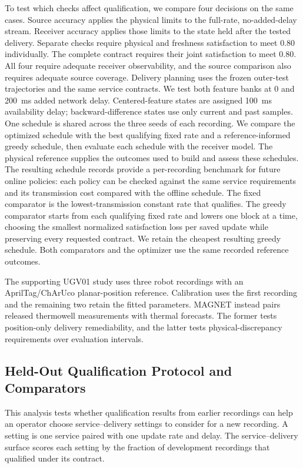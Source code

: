 \documentclass[journal]{IEEEtran}
\newcommand{\new}[1]{#1}
\newcommand{\rev}[1]{#1}
\begin{document}
To test which checks affect qualification, we compare four decisions on
the same cases. Source accuracy applies the physical limits to the
full-rate, no-added-delay stream. Receiver accuracy applies those limits
to the state held after the tested delivery. Separate checks require
physical and freshness satisfaction to meet 0.80 individually. The
complete contract requires their joint satisfaction to meet 0.80.
All four require adequate receiver observability, and the source
comparison also requires adequate source coverage.
\new{Delivery planning uses the frozen outer-test trajectories and the
same service contracts. We test both feature banks at 0 and 200~ms added
network delay. Centered-feature states are assigned 100~ms availability
delay; backward-difference states use only current and past samples. One
schedule is shared across the three seeds of each recording. We compare
the optimized schedule with the best qualifying fixed rate and a
reference-informed greedy schedule, then evaluate each schedule with the
receiver model. The physical reference supplies the outcomes used to build
and assess these schedules. The resulting schedule records provide
a per-recording benchmark for future online policies: each policy can be
checked against the same service requirements and its transmission cost
compared with the offline schedule.}
\rev{The fixed comparator is the lowest-transmission constant rate that
qualifies. The greedy comparator starts from each qualifying fixed rate
and lowers one block at a time, choosing the smallest normalized
satisfaction loss per saved update while preserving every requested
contract. We retain the cheapest resulting greedy schedule. Both
comparators and the optimizer use the same recorded reference outcomes.}

\rev{The supporting UGV01 study uses three robot recordings with an
AprilTag/ChArUco planar-position reference. Calibration uses the first
recording and the remaining two retain the fitted parameters. MAGNET
instead pairs released thermowell measurements with thermal forecasts.
The former tests position-only delivery remediability, and the latter
tests physical-discrepancy requirements over evaluation intervals.}

\subsection{Held-Out Qualification Protocol and Comparators}
\label{subsec:heldout_protocol}

This analysis tests whether qualification results from earlier recordings can help an operator choose service--delivery settings to consider for a
new recording. A setting is one service paired with one update rate and delay. The service--delivery surface scores each setting by the fraction of development recordings that qualified under its contract.
\end{document}
